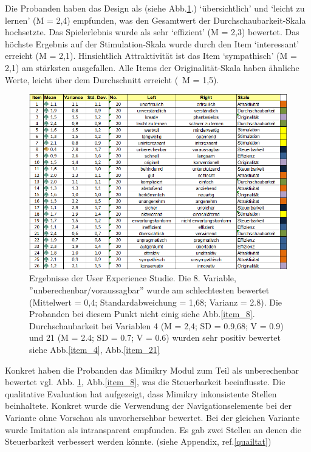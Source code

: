 Die Probanden haben das Design als (siehe Abb.\ref{uxmimikry_detailed}.) ‘übersichtlich’ und ‘leicht zu lernen’ (M = 2,4) empfunden, was den Gesamtwert der Durchschaubarkeit-Skala hochsetzte. Das Spielerlebnis wurde als sehr ‘effizient’ (M = 2,3) bewertet. Das höchste Ergebnis auf der Stimulation-Skala wurde durch den Item ‘interessant’ erreicht (M = 2,1). Hinsichtlich Attraktivität ist das Item ‘sympathisch’ (M = 2,1) am stärksten ausgefallen. Alle Items der Originalität-Skala haben ähnliche Werte, leicht über dem Durchschnitt erreicht (~M = 1,5).

\begin{figure}[H]
\centering\includegraphics[width=360pt]{res/ueq_detalliert}
\caption{Ergebnisse der User Experience Studie. Die 8. Variable, ''unberechenbar/voraussagbar'' wurde am schlechtesten bewertet (Mittelwert = 0,4; Standardabweichung = 1,68; Varianz = 2.8). Die Probanden bei diesem Punkt nicht einig siehe Abb.\ref{item_8}. Durchschaubarkeit bei Variablen 4 (M = 2,4; SD = 0.9,68; V = 0.9) und 21 (M = 2.4; SD = 0.7; V = 0.6) wurden sehr positiv bewertet siehe Abb.\ref{item_4}, Abb.\ref{item_21}}
\label{uxmimikry_detailed}
\end{figure}
Konkret haben die Probanden das Mimikry Modul zum Teil als unberechenbar bewertet vgl. Abb. \ref{uxmimikry_detailed},  Abb.\ref{item_8}, was die Steuerbarkeit beeinflusste. 
Die qualitative Evaluation hat aufgezeigt, dass Mimikry inkonsistente Stellen beinhaltete. Konkret wurde die Verwendung der Navigationselemente bei der Variante ohne Vorschau als unvorhersehbar bewertet. Bei der gleichen Variante wurde Imitation als intransparent empfunden.
Es gab zwei Stellen an denen die Steuerbarkeit verbessert werden könnte. (siehe Appendix, ref.\ref{quailtat}) \\
